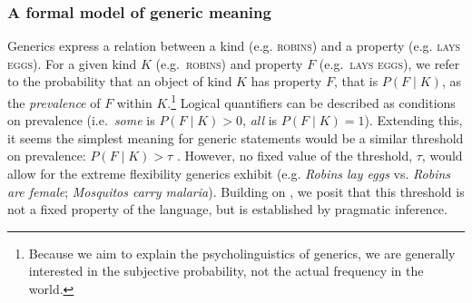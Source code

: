 \documentclass[11pt,letterpaper]{article}
\begin{document}
\subsubsection*{A formal model of generic meaning}

Generics express a relation between a kind (e.g. \textsc{robins}) and a property (e.g. \textsc{lays eggs}). 
For a given kind $K$ (e.g.~\textsc{robins}) and property $F$ (e.g.~\textsc{lays eggs}), we refer to the probability that an object of kind $K$ has property $F$, that is $P(F\mid K)$, as the \emph{prevalence} of $F$ within $K$.\footnote{Because we aim to explain the psycholinguistics of generics, we are generally interested in the subjective probability, not the actual frequency in the world.}
Logical quantifiers can be described as conditions on prevalence (i.e.~\emph{some} is $P(F\mid K)>0$, \emph{all} is $P(F\mid K)=1$). 
Extending this, it seems the simplest meaning for generic statements would be a similar threshold on prevalence: $P(F\mid K)>\tau$ \cite{Cohen1999}. 
However, no fixed value of the threshold, $\tau$, would allow for the extreme flexibility generics exhibit (e.g. \emph{Robins lay eggs} vs. \emph{Robins are female}; \emph{Mosquitos carry malaria}).
Building on , we posit that this threshold is not a fixed property of the language, but is established by pragmatic inference.
\end{document}
